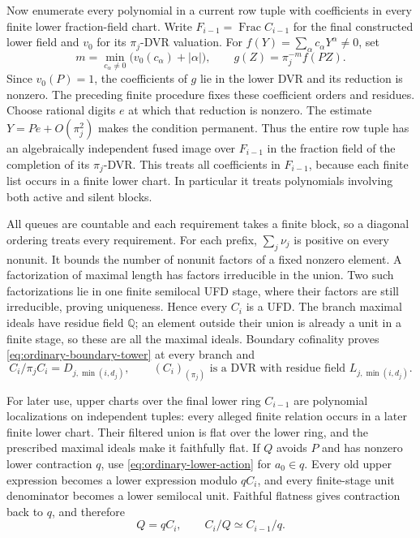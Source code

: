 \documentclass[11pt,reqno]{amsart}
\numberwithin{equation}{section}
\theoremstyle{plain}
\theoremstyle{definition}
\theoremstyle{remark}
\begin{document}
Now enumerate every polynomial in a current row tuple with
coefficients in every finite lower fraction-field chart.
Write \(F_{i-1}=\operatorname{Frac}C_{i-1}\) for the final constructed
lower field and \(v_0\) for its \(\pi_j\)-DVR valuation.
For \(f(Y)=\sum_\alpha c_\alpha Y^\alpha\ne0\), set
\[
 m=\min_{c_\alpha\ne0}\bigl(v_0(c_\alpha)+|\alpha|\bigr),
 \qquad g(Z)=\pi_j^{-m}f(PZ).
\]
Since \(v_0(P)=1\), the coefficients of \(g\) lie in the lower
DVR and its reduction is nonzero. The preceding finite procedure
fixes these coefficient orders and residues. Choose rational digits
\(e\) at which that reduction is nonzero. The estimate
\(Y=Pe+O(\pi_j^2)\) makes the condition permanent.
Thus the entire row tuple has an algebraically independent
fused image over \(F_{i-1}\) in the fraction field of the completion
of its \(\pi_j\)-DVR. This treats all coefficients in
\(F_{i-1}\), because each finite list occurs in a finite
lower chart. In particular it treats polynomials involving
both active and silent blocks.

All queues are countable and each requirement takes a finite
block, so a diagonal ordering treats every requirement.
For each prefix, \(\sum_j\nu_j\) is positive on every nonunit.
It bounds the number of nonunit factors of a fixed nonzero
element. A factorization of maximal length has factors
irreducible in the union. Two such factorizations lie in one
finite semilocal UFD stage, where their factors are still
irreducible, proving uniqueness. Hence every \(C_i\) is a UFD.
The branch maximal ideals have residue field \(\mathbb Q\);
an element outside their union is already a unit in a finite
stage, so these are all the maximal ideals.
Boundary cofinality proves \eqref{eq:ordinary-boundary-tower}
at every branch and
\begin{equation}\label{eq:ordinary-special-quotient}
 C_i/\pi_jC_i=D_{j,\min(i,d_j)},\qquad
 (C_i)_{(\pi_j)}\text{ is a DVR with residue field }
 L_{j,\min(i,d_j)}.
\end{equation}

For later use, upper charts over the final lower ring \(C_{i-1}\)
are polynomial localizations on independent tuples: every
alleged finite relation occurs in a later finite lower chart.
Their filtered union is flat over the lower ring, and the
prescribed maximal ideals make it faithfully flat.
If \(Q\) avoids \(P\) and has nonzero lower contraction \(q\),
use \eqref{eq:ordinary-lower-action} for \(a_0\in q\).
Every old upper expression becomes a lower expression modulo
\(qC_i\), and every finite-stage unit denominator becomes
a lower semilocal unit. Faithful flatness gives contraction
back to \(q\), and therefore
\begin{equation}\label{eq:ordinary-inherited}
       Q=qC_i,\qquad C_i/Q\simeq C_{i-1}/q.
\end{equation}
\end{document}

